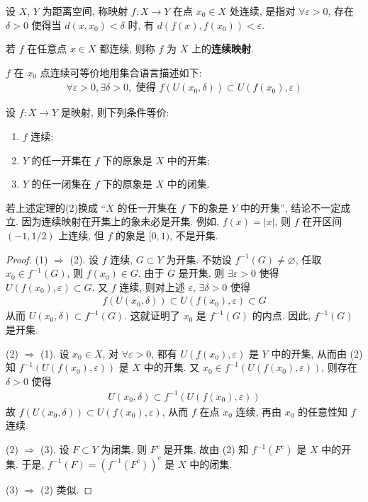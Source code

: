 \documentclass[../../main.tex]{subfiles}
\begin{document}
\begin{definition}[连续映射]
设 $X$, $Y$ 为距离空间, 称映射 $f : X \to Y$ 在点 $x_0 \in X$ 处连续, 是指对 $\forall \varepsilon > 0$, 存在 $\delta > 0$ 使得当 $d(x, x_0) < \delta$ 时, 有 $d(f(x), f(x_0)) < \varepsilon$.

若 $f$ 在任意点 $x \in X$ 都连续, 则称 $f$ 为 $X$ 上的\textbf{连续映射}.
\end{definition}
\begin{remark}
$f$ 在 $x_0$ 点连续可等价地用集合语言描述如下:
\begin{align*}
\forall \varepsilon > 0, \exists \delta > 0, \text{ 使得 } f(U(x_0, \delta)) \subset U(f(x_0), \varepsilon)
\end{align*}
\end{remark}

\begin{theorem}[连续映射的充要条件]\label{theorem:连续映射的充要条件}
设 $f : X \to Y$ 是映射, 则下列条件等价:
\begin{enumerate}[(1)]
\item $f$ 连续;
\item $Y$ 的任一开集在 $f$ 下的原象是 $X$ 中的开集;
\item $Y$ 的任一闭集在 $f$ 下的原象是 $X$ 中的闭集.
\end{enumerate}
\end{theorem}
\begin{remark}
若上述定理的(2)换成 “$X$ 的任一开集在 $f$ 下的象是 $Y$ 中的开集”, 结论不一定成立. 因为连续映射在开集上的象未必是开集. 例如, $f(x) = |x|$, 则 $f$ 在开区间 $(-1, 1/2)$ 上连续, 但 $f$ 的象是 $[0, 1)$, 不是开集. 
\end{remark}
\begin{proof}
(1) $\Rightarrow$ (2). 设 $f$ 连续, $G \subset Y$ 为开集. 不妨设 $f^{-1}(G) \neq \varnothing$, 任取 $x_0 \in f^{-1}(G)$, 则 $f(x_0) \in G$. 由于 $G$ 是开集, 则 $\exists \varepsilon > 0$ 使得 $U(f(x_0), \varepsilon) \subset G$. 又 $f$ 连续, 则对上述 $\varepsilon$, $\exists \delta > 0$ 使得
\begin{align*}
f(U(x_0, \delta)) \subset U(f(x_0), \varepsilon) \subset G
\end{align*}
从而 $U(x_0, \delta) \subset f^{-1}(G)$. 这就证明了 $x_0$ 是 $f^{-1}(G)$ 的内点. 因此, $f^{-1}(G)$ 是开集.

(2) $\Rightarrow$ (1). 设 $x_0 \in X$, 对 $\forall \varepsilon > 0$, 都有 $U(f(x_0), \varepsilon)$ 是 $Y$ 中的开集, 从而由 (2) 知 $f^{-1}(U(f(x_0), \varepsilon))$ 是 $X$ 中的开集. 又 $x_0 \in f^{-1}(U(f(x_0), \varepsilon))$, 则存在 $\delta > 0$ 使得
\begin{align*}
U(x_0, \delta) \subset f^{-1}(U(f(x_0), \varepsilon))
\end{align*}
故 $f(U(x_0, \delta)) \subset U(f(x_0), \varepsilon)$, 从而 $f$ 在点 $x_0$ 连续, 再由 $x_0$ 的任意性知 $f$ 连续.

(2) $\Rightarrow$ (3). 设 $F \subset Y$ 为闭集, 则 $F^c$ 是开集, 故由 (2) 知 $f^{-1}(F^c)$ 是 $X$ 中的开集. 于是, $f^{-1}(F) = (f^{-1}(F^c))^c$ 是 $X$ 中的闭集. 

(3) $\Rightarrow$ (2) 类似.
\end{proof}
\end{document}
